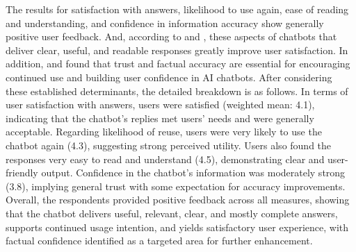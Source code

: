 \begin{refsection}
The results for satisfaction with answers, likelihood to use again, ease of reading and understanding, and confidence in information accuracy show generally positive user feedback. And, according to \citeauthor{kaushal2022role} \citeyear{kaushal2022role} and \citeauthor{okonkwo2021chatbots} \citeyear{okonkwo2021chatbots}, these aspects of chatbots that deliver clear, useful, and readable responses greatly improve user satisfaction. In addition, \citeauthor{choudhury2023investigating} \citeyear{choudhury2023investigating} and \citeauthor{zhang2024ai} \citeyear{zhang2024ai} found that trust and factual accuracy are essential for encouraging continued use and building user confidence in AI chatbots. After considering these established determinants, the detailed breakdown is as follows. In terms of user satisfaction with answers, users were satisfied (weighted mean: 4.1), indicating that the chatbot’s replies met users’ needs and were generally acceptable. Regarding likelihood of reuse, users were very likely to use the chatbot again (4.3), suggesting strong perceived utility. Users also found the responses very easy to read and understand (4.5), demonstrating clear and user-friendly output. Confidence in the chatbot’s information was moderately strong (3.8), implying general trust with some expectation for accuracy improvements. Overall, the respondents provided positive feedback across all measures, showing that the chatbot delivers useful, relevant, clear, and mostly complete answers, supports continued usage intention, and yields satisfactory user experience, with factual confidence identified as a targeted area for further enhancement.

\clearpage

\printbibliography[heading=subbibintoc, title={\centering Notes}]
\end{refsection}